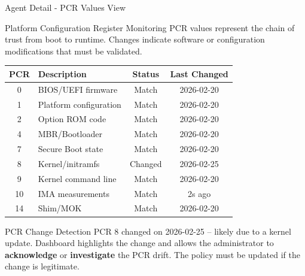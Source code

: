 \begin{frame}{Agent Detail - PCR Values View}
  \begin{block}{Platform Configuration Register Monitoring}
    \scriptsize
    PCR values represent the chain of trust from boot to runtime. Changes indicate
    software or configuration modifications that must be validated.
  \end{block}

  \vspace{0.1cm}

  \begin{center}
    \scriptsize
    \begin{tabular}{|c|l|c|c|}
      \hline
      \textbf{PCR} & \textbf{Description} & \textbf{Status} & \textbf{Last Changed} \\
      \hline
      \hline
      0 & BIOS/UEFI firmware & \textcolor{successgreen}{Match} & 2026-02-20 \\
      \hline
      1 & Platform configuration & \textcolor{successgreen}{Match} & 2026-02-20 \\
      \hline
      2 & Option ROM code & \textcolor{successgreen}{Match} & 2026-02-20 \\
      \hline
      4 & MBR/Bootloader & \textcolor{successgreen}{Match} & 2026-02-20 \\
      \hline
      7 & Secure Boot state & \textcolor{successgreen}{Match} & 2026-02-20 \\
      \hline
      8 & Kernel/initramfs & \textcolor{warningyellow}{Changed} & 2026-02-25 \\
      \hline
      9 & Kernel command line & \textcolor{successgreen}{Match} & 2026-02-20 \\
      \hline
      10 & IMA measurements & \textcolor{successgreen}{Match} & 2s ago \\
      \hline
      14 & Shim/MOK & \textcolor{successgreen}{Match} & 2026-02-20 \\
      \hline
    \end{tabular}
  \end{center}

  \vspace{0.2cm}

  \begin{alertblock}{PCR Change Detection}
    \scriptsize
    PCR 8 changed on 2026-02-25 -- likely due to a kernel update.
    Dashboard highlights the change and allows the administrator to
    \textbf{acknowledge} or \textbf{investigate} the PCR drift.
    The policy must be updated if the change is legitimate.
  \end{alertblock}
\end{frame}
